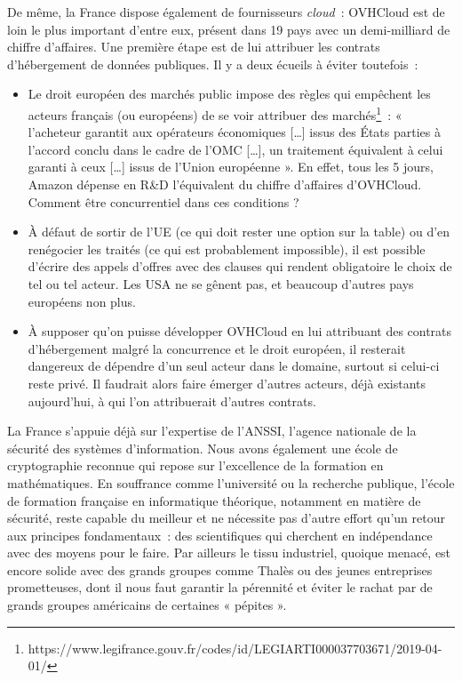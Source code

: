 \documentclass[a4paper]{article}
\begin{document}
De même, la France dispose également de fournisseurs \textit{cloud}~: OVHCloud est de loin le plus important d’entre eux, présent dans 19 pays avec un demi-milliard de chiffre d’affaires. Une première étape est de lui attribuer les contrats d’hébergement de données publiques. Il y a deux écueils à éviter toutefois~:
\begin{itemize}
\item Le droit européen des marchés public impose des règles qui empêchent les acteurs français (ou européens) de se voir attribuer des marchés\footnote{https://www.legifrance.gouv.fr/codes/id/LEGIARTI000037703671/2019-04-01/}~: « l'acheteur garantit aux opérateurs économiques [\ldots] issus des États parties à l'accord conclu dans le cadre de l'OMC [\ldots], un traitement équivalent à celui garanti à ceux [\ldots] issus de l'Union européenne ». En effet, tous les 5 jours, Amazon dépense en R\&D l’équivalent du chiffre d’affaires d’OVHCloud. Comment être concurrentiel dans ces conditions ? 
\item À défaut de sortir de l’UE (ce qui doit rester une option sur la table) ou d’en renégocier les traités (ce qui est probablement impossible), il est possible d’écrire des appels d’offres avec des clauses qui rendent obligatoire le choix de tel ou tel acteur. Les USA ne se gênent pas, et beaucoup d’autres pays européens non plus. 
\item À supposer qu’on puisse développer OVHCloud en lui attribuant des contrats d’hébergement malgré la concurrence et le droit européen, il resterait dangereux de dépendre d’un seul acteur dans le domaine, surtout si celui-ci reste privé. Il faudrait alors faire émerger d’autres acteurs, déjà existants aujourd’hui, à qui l’on attribuerait d’autres contrats.
\end{itemize}
La France s’appuie déjà sur l’expertise de l’ANSSI, l’agence nationale de la sécurité des systèmes d’information. Nous avons également une école de cryptographie reconnue qui repose sur l’excellence de la formation en mathématiques. En souffrance comme l’université ou la recherche publique, l’école de formation française en informatique théorique, notamment en matière de sécurité, reste capable du meilleur et ne nécessite pas d’autre effort qu’un retour aux principes fondamentaux~: des scientifiques qui cherchent en indépendance avec des moyens pour le faire. Par ailleurs le tissu industriel, quoique menacé, est encore solide avec des grands groupes comme Thalès ou des jeunes entreprises prometteuses, dont il nous faut garantir la pérennité et éviter le rachat par de grands groupes américains de certaines « pépites ».
\end{document}
